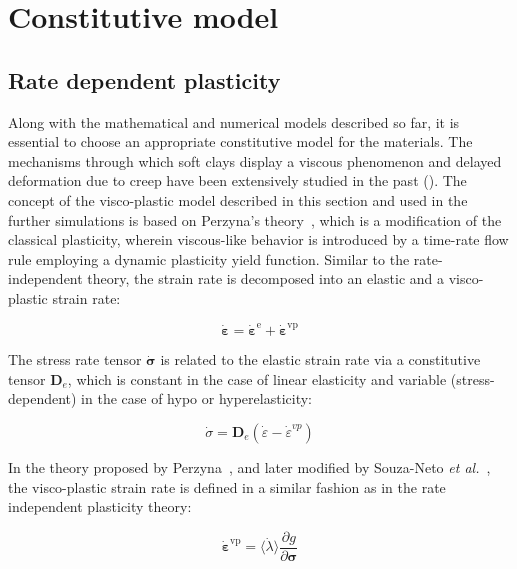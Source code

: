 \documentclass[applsci,journal,article,submit,moreauthors,pdftex]{Definitions/mdpi}
\begin{document}
 
\section{Constitutive model}


\subsection{Rate dependent plasticity}
Along with the mathematical and numerical models described so far, it is essential to choose an appropriate constitutive model for the materials. The mechanisms through which soft clays display a viscous phenomenon and delayed deformation due to creep have been extensively studied in the past (\cite{Bjerrum1967}).
The concept of the visco-plastic model described in this section and used in the further simulations is based on Perzyna’s theory~\cite{Perzyna:66}, which is a modification of the classical plasticity, wherein viscous-like behavior is introduced by a time-rate flow rule employing a dynamic plasticity yield function. Similar to the rate-independent theory, the strain rate is decomposed into an elastic and a visco-plastic strain rate:

\begin{equation}
\dot{\boldsymbol{\varepsilon}}=\dot{\boldsymbol{\varepsilon}}^{\mathrm{e}}+\dot{\boldsymbol{\varepsilon}}^{\mathrm{vp}}
\end{equation}

The stress rate tensor $\boldsymbol{\dot{\sigma}}$ is related to the elastic strain rate via a constitutive tensor $\boldsymbol{D}_{e}$, which is constant in the case of linear elasticity and variable (stress-dependent) in the case of hypo or hyperelasticity:

\begin{equation}
\dot{\sigma}=\mathbf{D}_{e}\left(\dot{\varepsilon}-\dot{\varepsilon}^{v p}\right)
\end{equation}

In the theory proposed by Perzyna~\cite{Perzyna:66}, and later modified by Souza-Neto \textit{et al.}~\cite{DPOwen2005}, the visco-plastic strain rate is defined in a similar fashion as in the rate independent plasticity theory:

\begin{equation}
\dot{\boldsymbol{\varepsilon}}^{\mathrm{vp}}=\langle \dot{\lambda}\rangle \frac{\partial g}{\partial \boldsymbol{\sigma}}
\end{equation}
\end{document}
